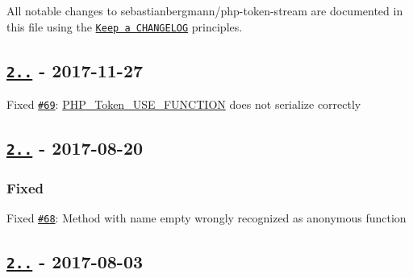 All notable changes to {\ttfamily sebastianbergmann/php-\/token-\/stream} are documented in this file using the \href{http://keepachangelog.com/}{\tt Keep a C\+H\+A\+N\+G\+E\+L\+OG} principles.

\subsection*{\href{https://github.com/sebastianbergmann/php-token-stream/compare/2.0.1...2.0.2}{\tt 2..} -\/ 2017-\/11-\/27}


\begin{DoxyItemize}
\item Fixed \href{https://github.com/sebastianbergmann/php-token-stream/issues/69}{\tt \#69}\+: {\ttfamily \mbox{\hyperlink{class_p_h_p___token___u_s_e___f_u_n_c_t_i_o_n}{P\+H\+P\+\_\+\+Token\+\_\+\+U\+S\+E\+\_\+\+F\+U\+N\+C\+T\+I\+ON}}} does not serialize correctly
\end{DoxyItemize}

\subsection*{\href{https://github.com/sebastianbergmann/php-token-stream/compare/2.0.0...2.0.1}{\tt 2..} -\/ 2017-\/08-\/20}

\subsubsection*{Fixed}


\begin{DoxyItemize}
\item Fixed \href{https://github.com/sebastianbergmann/php-token-stream/issues/68}{\tt \#68}\+: Method with name {\ttfamily empty} wrongly recognized as anonymous function
\end{DoxyItemize}

\subsection*{\href{https://github.com/sebastianbergmann/php-token-stream/compare/1.4.11...2.0.0}{\tt 2..} -\/ 2017-\/08-\/03}